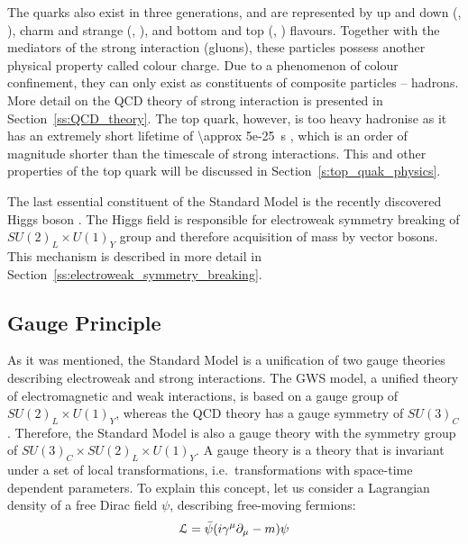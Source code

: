 The quarks also exist in three generations, and are represented by up and down (\cPqu, \cPqd), charm and strange (\cPqc,
\cPqs), and bottom and top (\cPqb, \cPqt) flavours. Together with the mediators of the strong interaction (gluons),
these particles possess another physical property called colour charge. Due to a phenomenon of colour confinement, they
can only exist as constituents of composite particles -- hadrons. More detail on the QCD theory of strong interaction is
presented in Section~\ref{ss:QCD_theory}. The top quark, however, is too heavy hadronise as it has an extremely short
lifetime of \SI{\approx 5e-25}{\s} \autocite{PDG}, which is an order of magnitude shorter than the timescale of strong
interactions. This and other properties of the top quark will be discussed in Section~\ref{s:top_quak_physics}.

The last essential constituent of the Standard Model is the recently discovered Higgs boson
\autocite{ATLAS_higgs_observation, CMS_higgs_observation}. The Higgs field is responsible for electroweak symmetry
breaking of $SU(2)_L \times U(1)_Y$ group and therefore acquisition of mass by vector bosons. This mechanism is
described in more detail in Section~\ref{ss:electroweak_symmetry_breaking}.



\newpage
\subsection{Gauge Principle}
\label{ss:gauge_principle}
As it was mentioned, the Standard Model is a unification of two gauge theories describing electroweak and strong
interactions. The GWS model, a unified theory of electromagnetic and weak interactions, is based on a gauge group of
$SU(2)_L \times U(1)_Y$, whereas the QCD theory has a gauge symmetry of $SU(3)_C$. Therefore, the Standard Model is also
a gauge theory with the symmetry group of $SU(3)_C \times SU(2)_L \times U(1)_Y$. A gauge theory is a theory that is
invariant under a set of local transformations, i.e.\ transformations with space-time dependent parameters. To explain
this concept, let us consider a Lagrangian density of a free Dirac field $\psi$, describing free-moving fermions:
\begin{equation}
\mathcal{L} = \bar{\psi}(i \gamma^\mu	\partial_\mu - m) \psi
\label{eq:dirac_field_L}
\end{equation}

